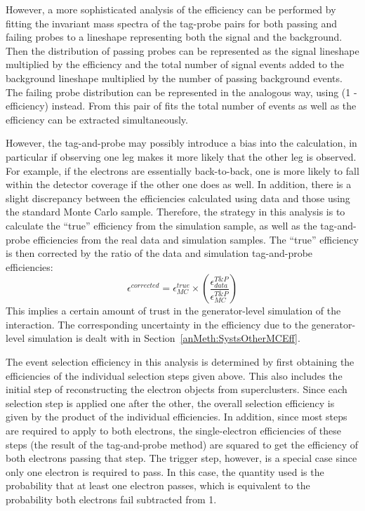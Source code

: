 However, a more sophisticated analysis of the efficiency can 
be performed by fitting the invariant mass spectra of the
tag-probe pairs for both passing and failing probes to a 
lineshape representing both the signal and the background.  
Then the distribution of passing probes can be represented as 
the signal lineshape multiplied by the efficiency and the
total number of signal events added to the background lineshape 
multiplied by the number of passing background events.  
The failing probe distribution can be represented in the 
analogous way, using (1 - efficiency) instead.  
From this pair of fits the total number of events as well as 
the efficiency can be extracted simultaneously.  

However, the tag-and-probe may possibly introduce a bias 
into the calculation, 
in particular if observing one leg makes it more likely that 
the other leg is observed. 
For example, if the electrons are essentially back-to-back, 
one is more likely to fall within the detector coverage 
if the other one does as well.  
In addition, there is a slight discrepancy between the efficiencies 
calculated using data and those using the standard Monte Carlo sample.  
Therefore, the strategy in this analysis is to calculate the 
``true'' efficiency from the simulation sample, 
as well as the tag-and-probe efficiencies from the real data 
and simulation samples.  
The ``true'' efficiency is then corrected by the ratio of the 
data and simulation tag-and-probe efficiencies:
\[
\epsilon^{corrected} = \epsilon_{MC}^{true} \times \left( \frac{\epsilon_{data}^{T\&P}}{\epsilon_{MC}^{T\&P}} \right)
\]
This implies a certain amount of trust in the generator-level simulation of the interaction.  
The corresponding uncertainty in the efficiency due to the generator-level simulation 
is dealt with in 
Section~\ref{anMeth:SystsOtherMCEff}.  

The event selection efficiency in this analysis is determined 
by first obtaining the efficiencies of the individual 
selection steps given above.%
This also includes the initial step of reconstructing 
the electron objects from superclusters.  
Since each selection step is applied one after the other, 
the overall selection efficiency is given by the product 
of the individual efficiencies.  
In addition, since most steps are required to apply to both electrons, 
the single-electron efficiencies of these steps 
(the result of the tag-and-probe method)
are squared to get 
the efficiency of both electrons passing that step.  
The trigger step, however, is a special case since only one electron is 
required to pass.  
In this case, the quantity used is the probability that at least 
one electron passes, 
which is equivalent to the probability both electrons fail 
subtracted from 1.  

